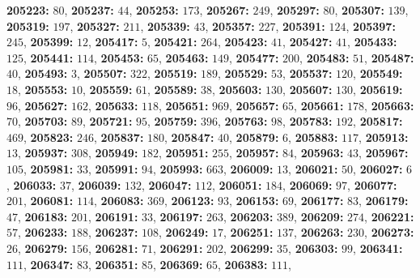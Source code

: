 \textsf{\bfseries 205223:} $80$, \textsf{\bfseries 205237:} $44$, \textsf{\bfseries 205253:} $173$, \textsf{\bfseries 205267:} $249$, \textsf{\bfseries 205297:} $80$, \textsf{\bfseries 205307:} $139$, \textsf{\bfseries 205319:} $197$, \textsf{\bfseries 205327:} $211$, \textsf{\bfseries 205339:} $43$, \textsf{\bfseries 205357:} $227$, \textsf{\bfseries 205391:} $124$, \textsf{\bfseries 205397:} $245$, \textsf{\bfseries 205399:} $12$, \textsf{\bfseries 205417:} $5$, \textsf{\bfseries 205421:} $264$, \textsf{\bfseries 205423:} $41$, \textsf{\bfseries 205427:} $41$, \textsf{\bfseries 205433:} $125$, \textsf{\bfseries 205441:} $114$, \textsf{\bfseries 205453:} $65$, \textsf{\bfseries 205463:} $149$, \textsf{\bfseries 205477:} $200$, \textsf{\bfseries 205483:} $51$, \textsf{\bfseries 205487:} $40$, \textsf{\bfseries 205493:} $3$, \textsf{\bfseries 205507:} $322$, \textsf{\bfseries 205519:} $189$, \textsf{\bfseries 205529:} $53$, \textsf{\bfseries 205537:} $120$, \textsf{\bfseries 205549:} $18$, \textsf{\bfseries 205553:} $10$, \textsf{\bfseries 205559:} $61$, \textsf{\bfseries 205589:} $38$, \textsf{\bfseries 205603:} $130$, \textsf{\bfseries 205607:} $130$, \textsf{\bfseries 205619:} $96$, \textsf{\bfseries 205627:} $162$, \textsf{\bfseries 205633:} $118$, \textsf{\bfseries 205651:} $969$, \textsf{\bfseries 205657:} $65$, \textsf{\bfseries 205661:} $178$, \textsf{\bfseries 205663:} $70$, \textsf{\bfseries 205703:} $89$, \textsf{\bfseries 205721:} $95$, \textsf{\bfseries 205759:} $396$, \textsf{\bfseries 205763:} $98$, \textsf{\bfseries 205783:} $192$, \textsf{\bfseries 205817:} $469$, \textsf{\bfseries 205823:} $246$, \textsf{\bfseries 205837:} $180$, \textsf{\bfseries 205847:} $40$, \textsf{\bfseries 205879:} $6$, \textsf{\bfseries 205883:} $117$, \textsf{\bfseries 205913:} $13$, \textsf{\bfseries 205937:} $308$, \textsf{\bfseries 205949:} $182$, \textsf{\bfseries 205951:} $255$, \textsf{\bfseries 205957:} $84$, \textsf{\bfseries 205963:} $43$, \textsf{\bfseries 205967:} $105$, \textsf{\bfseries 205981:} $33$, \textsf{\bfseries 205991:} $94$, \textsf{\bfseries 205993:} $663$, \textsf{\bfseries 206009:} $13$, \textsf{\bfseries 206021:} $50$, \textsf{\bfseries 206027:} $6$, \textsf{\bfseries 206033:} $37$, \textsf{\bfseries 206039:} $132$, \textsf{\bfseries 206047:} $112$, \textsf{\bfseries 206051:} $184$, \textsf{\bfseries 206069:} $97$, \textsf{\bfseries 206077:} $201$, \textsf{\bfseries 206081:} $114$, \textsf{\bfseries 206083:} $369$, \textsf{\bfseries 206123:} $93$, \textsf{\bfseries 206153:} $69$, \textsf{\bfseries 206177:} $83$, \textsf{\bfseries 206179:} $47$, \textsf{\bfseries 206183:} $201$, \textsf{\bfseries 206191:} $33$, \textsf{\bfseries 206197:} $263$, \textsf{\bfseries 206203:} $389$, \textsf{\bfseries 206209:} $274$, \textsf{\bfseries 206221:} $57$, \textsf{\bfseries 206233:} $188$, \textsf{\bfseries 206237:} $108$, \textsf{\bfseries 206249:} $17$, \textsf{\bfseries 206251:} $137$, \textsf{\bfseries 206263:} $230$, \textsf{\bfseries 206273:} $26$, \textsf{\bfseries 206279:} $156$, \textsf{\bfseries 206281:} $71$, \textsf{\bfseries 206291:} $202$, \textsf{\bfseries 206299:} $35$, \textsf{\bfseries 206303:} $99$, \textsf{\bfseries 206341:} $111$, \textsf{\bfseries 206347:} $83$, \textsf{\bfseries 206351:} $85$, \textsf{\bfseries 206369:} $65$, \textsf{\bfseries 206383:} $111$, 
